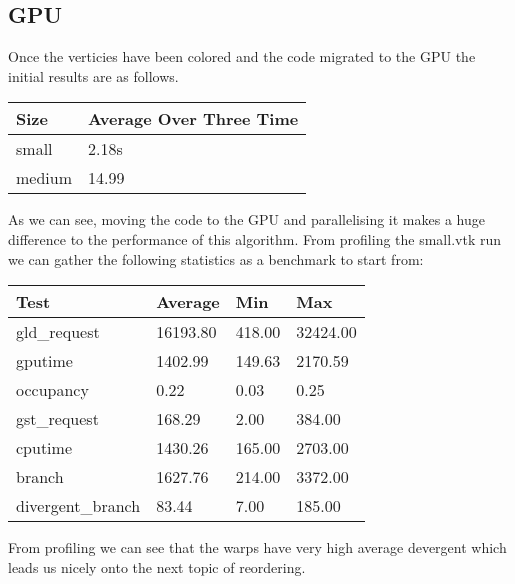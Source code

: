 \subsection*{GPU}
Once the verticies have been colored and the code migrated to the GPU the initial results are as follows.\\
\begin{tabular}{ l | l }
  \hline
  Size & Average Over Three Time \\
  \hline
  \hline
  small & 2.18s \\
  medium & 14.99 \\
  \hline
\end{tabular}

As we can see, moving the code to the GPU and parallelising it makes a huge difference to the performance of this algorithm.
From profiling the small.vtk run we can gather the following statistics as a benchmark to start from:\\
\begin{tabular}{ l | l | l | l}
\hline
Test & Average & Min & Max \\
\hline
\hline
gld\_request & 16193.80 & 418.00 & 32424.00 \\
gputime & 1402.99 & 149.63 & 2170.59 \\
occupancy & 0.22 & 0.03 & 0.25 \\
gst\_request & 168.29 & 2.00 & 384.00 \\
cputime & 1430.26 & 165.00 & 2703.00 \\
branch & 1627.76 & 214.00 & 3372.00 \\
divergent\_branch & 83.44 & 7.00 & 185.00 \\
\hline
\end{tabular}

From profiling we can see that the warps have very high average devergent which leads us nicely onto the next topic of reordering.
